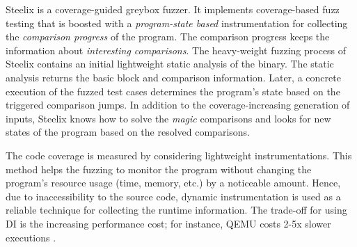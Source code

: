 Steelix \cite{li2017steelix} is a coverage-guided greybox fuzzer. It implements coverage-based fuzz testing that is boosted with a \textit{program-state based} instrumentation for collecting the \textit{comparison progress} of the program. The comparison progress keeps the information about \textit{interesting comparisons}. The heavy-weight fuzzing process of Steelix contains an initial lightweight static analysis of the binary. The static analysis returns the basic block and comparison information. Later, a concrete execution of the fuzzed test cases determines the program's state based on the triggered comparison jumps. In addition to the coverage-increasing generation of inputs, Steelix knows how to solve the \textit{magic} comparisons and looks for new states of the program based on the resolved comparisons.

The code coverage is measured by considering lightweight instrumentations. This method helps the fuzzing to monitor the program without changing the program's resource usage (time, memory, etc.) by a noticeable amount. Hence, due to inaccessibility to the source code, dynamic instrumentation is used as a reliable technique for collecting the runtime information. The trade-off for using DI is the increasing performance cost; for instance, QEMU costs 2-5x slower executions \cite{afl_qemu}.

